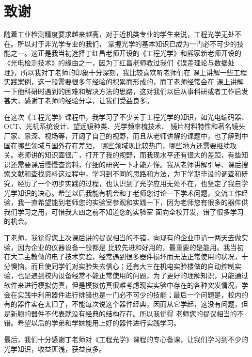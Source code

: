 \chapter[致谢]{致\quad 谢}%
\thispagestyle{noheaderstyle}%
\pagestyle{noheaderstyle}%

随着工业检测精度要求越来越高，对于近机类专业的学生来说，工程光学无处不在。所以对于非光学专业的我们，
掌握光学的基本知识已成为一门必不可少的技能之一。这正是我当初选择丁红昌老师开设的《工程光学》和熊家新老师开设的
《光电检测技术》的缘由之一，因为丁红昌老师教过我们《误差理论与数据处理》，所以我对丁老师的印象十分深刻，我比较喜欢听老师们在
课上讲解一些工程实践案例，这一般需要很多年经验的积累而形成的，而丁老师经常会在
课上讲解一下他科研时遇到的困难和解决方法的思路，这对我们以后从事科研或者工作启发甚大，感谢丁老师的经验分享，让我们受益良多。

在这次《工程光学》课程中，我学习了不少关于工程光学的知识，如光电编码器、OCT、光机系统设计、望远镜种类、光学频率梳技术、
镜片材料特性和著名镜头厂家、景深、视场等，开阔了自己的视野，而且从老师讲解的课题中，也了解到中国在哪些领域与国外存在差距，
哪些领域现比较热门，哪些地方还需要继续攻关。老师讲的知识面很广，打开了我的视野，而我现水平还有很大的差距，有些知识还需要课后慢慢查资料，仔细的研究一下才能弄懂。我从老师讲解引导、课后搜索文献和查找资料这过程中，学习到不同的思路和方法，为下学期毕设的调查和研究，经历了一个初步实践的过程，也认识到了光学应用无处不在，也坚定了我自学光学知识的决心。希望以后我能有机会和丁老师您讨论一下学术问题，交流工作经验，我一直希望能到老师您的实验室参观和实践一下，因为老师您有很多的器件供我们学习之用，可惜我大四之前不知道您的实验室
面向全校开发，错了很多学习的机会。

丁老师，我觉得您上次课后讲的提议相当的不错，向现有的企业申请一两天去做实验，因为企业的仪器设备一般都是
比较先进和好用的，最重要的是能用。我当初在大二主教做的电子技术实验，经常遇到很多器件损坏而无法正常使用的状况，十分懊恼，而且使同学们对实验失去信心；还有大三在机电实验楼做的自动控制实验，也是遇到校内设备经常不能正常使用的问题，为了更好的理解知识，只能通过软件来进行模拟仿真，但是模拟仿真很难考虑现实实验中存在的各种突发情况，学会在实践中利用器件进行排错也是一门必不可少的技能；最后一个问题是，校内的有的器件实在太旧了，不能每次说这个器件经典，因而从它学起，这没有问题，但是新颖的器件不代表就没有经典的结构存在。所以我觉得
老师您的提议相当的不错。希望以后的学弟和学妹能用上好的器件进行实践学习。

最后，我们十分感谢丁老师对《工程光学》课程的专心备课，让我们学习到不少的光学知识，收益匪浅，获益良多。



